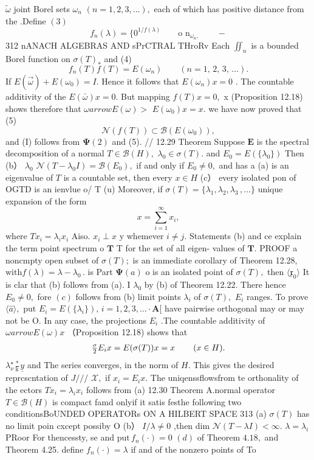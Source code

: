 $\tilde{\omega}$ joint Borel sets $\omega_{n}$ $(n=1,2,3,\ldots),$ each of which has positive distance from the .Define $({\mathcal{3}})$ $$ f_{n}(\lambda)= \{{\!0}^{1/f(\lambda)}\quad\quad\textrm{o n}_{\omega_{n},}\quad\quad{\!\!-} $$312 nANACH ALGEBRAS AND sPrCTRAL THroRv Each $\textstyle{\iint_{n}}$ is a bounded Borel function on $\sigma(T)_{*}$ and (4) $$ f_{n}(T)f(T)=E(\omega_{n})\qquad(n=1,\,2,\,3,\,\ldots). $$ If $E(\vec{\omega})+E(\omega_{0})=I.$ Hence it follows that $E(\omega_{n})x=0$ . The countable additivity of the $E({\bar{\omega}})x=0.$ But mapping $\textstyle f(T)x=0,$ x (Proposition 12.18) shows therefore that $\omega arrow E(\omega)>$ $E(\omega_{0})x=x.$ we have now proved that (5) $$ \mathcal{N}(f(T))\subset\mathcal{B}(E(\omega_{0})), $$ and (I) follows from $\mathbf{\Psi}(2)$ and (5). // 12.29 Theorem Suppose ${\boldsymbol{E}}$ is the spectral decomposition of a normal $T\in{\mathcal{B}}(H),$ $\lambda_{0}\in\sigma(T).$ and $E_{0}=E(\{\lambda_{0}\})$ Then (b） $\lambda_{0}$ $\mathcal{N}(T-\lambda_{0}I)=\mathcal{B}(E_{0}),$ if and only if $E_{0}\neq0,$ and has a (a) is an eigenvalue of ${\mathbf{}}T$ is a countable set, then every $x\in H$ (c） every isolated pon of OGTD is an ienvlue o/ T (u) Moreover, if $\sigma(T)=\{\lambda_{1},\lambda_{2},\lambda_{3}\,,\ldots\}$ unique expansion of the form $$ x=\sum_{i=1}^{\infty}x_{i}, $$ where $T x_{i}=\lambda_{i}x_{i}$ Aiso. $x_{i}\perp x$ y whemever $i\neq j.$ Statements (b) and ce explain the term point spectrum o ${\boldsymbol{T}}$ T for the set of all eigen- values of ${\boldsymbol{T}}.$ PROOF a noncmpty open subset of $\sigma(T);$ is an immediate corollary of Theorem 12.28, $\mathrm{with}f(\lambda)=\lambda-\lambda_{0}\,.$ is Part $\mathbf{\Psi}(a)$ o is an isolated point of $\sigma(T),$ then $\scriptstyle \langle{\mathfrak{x}}_{0} \rangle$ It is clar that (b) follows from (a). I $\lambda_{0}$ by (b) of Theorem 12.22. There hence $E_{0}\neq0,$ fore $\left(c\right)$ follows from (b) limit points $\lambda_{i}$ of $\sigma(T),$ $\textstyle E_{i}$ ranges. To prove $\langle{\hat{a}}\rangle,$ put $E_{i}=E(\{\lambda_{i}\}),\,i=1,2,3,\ldots\cdot\mathbf{A}[$ have pairwise orthogonal may or may not be O. In any case, the projections $\textstyle E_{i}$ .The countable additivity of $\omega arrow E(\omega)x$ （Proposition 12.18) shows that $$ \begin{array}{r l r l}{{\frac{\sigma}{2}}E_{i}x=E(\sigma(T))x=x\,}&{{}\quad(x\in H).}\end{array} $$ $\lambda_{\nu}^{\star}{\mathrm{\frac{*}{k}}}\underline{{{y}}}$ and The series converges, in the norm of $\textstyle H.$ This gives the desired reprcscntation of $J/{\big/}/$ ${\mathcal{X}},$ if $x_{i}=E_{i}x.$ The uniqenssflowsfrom te orthonality of the ectors $T x_{i}=\lambda_{i}x_{i}$ follows from (a) 12.30 Theorem A.normal operator $T\in{\mathcal{B}}(H)$ is compact famd onlyif it satis festhe following two conditionsBoUNDED OPERATORs ON A HILBERT SPACE 313 (a) $\sigma(T)$ has no limit poin cxcept possiby O (b） $I/\lambda\neq0$ ,then dim ${\mathcal{N}}(T-\lambda I)<\infty.$ $\lambda=\lambda_{i}$ PRoor For thencessty, se and $\mathrm{put}\,f_{n}(\cdot)=0$ $(d)$ of Theorem $4.18,$ and Theorem 4.25. define $f_{n}(\cdot)=\lambda$ if and of the nonzero points of To 